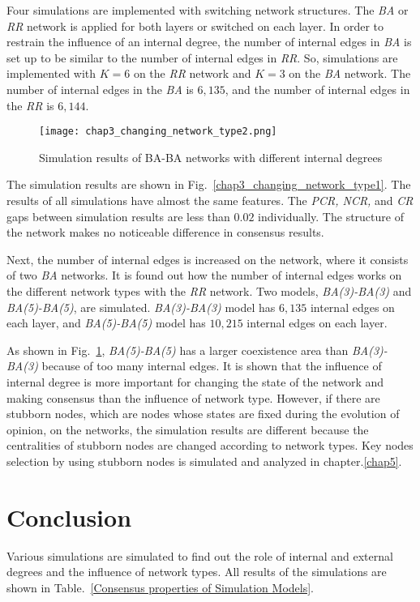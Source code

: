 Four simulations are implemented with switching network structures. The \textit{BA} or \textit{RR} network is applied for both layers or switched on each layer. In order to restrain the influence of an internal degree, the number of internal edges in \textit{BA} is set up to be similar to the number of internal edges in \textit{RR}. So, simulations are implemented with $K=6$ on the \textit{RR} network and $K=3$ on the \textit{BA} network. The number of internal edges in the \textit{BA} is $6,135$, and the number of internal edges in the \textit{RR} is $6,144$.

\begin{figure}[!htb]
	\centering
	\texttt{[image: chap3\_changing\_network\_type2.png]}
	\caption{Simulation results of BA-BA networks with different internal degrees}
	\label{chap3_changing_network_type2}
\end{figure}

The simulation results are shown in Fig.~\ref{chap3_changing_network_type1}. The results of all simulations have almost the same features. The \textit{PCR, NCR,} and \textit{CR} gaps between simulation results are less than $0.02$ individually. The structure of the network makes no noticeable difference in consensus results. 

Next, the number of internal edges is increased on the network, where it consists of two \textit{BA} networks. It is found out how the number of internal edges works on the different network types with the \textit{RR} network. Two models, \textit{BA(3)-BA(3)} and \textit{BA(5)-BA(5)}, are simulated. \textit{BA(3)-BA(3)} model has $6,135$ internal edges on each layer, and \textit{BA(5)-BA(5)} model has $10,215$ internal edges on each layer.

As shown in Fig.~\ref{chap3_changing_network_type2}, \textit{BA(5)-BA(5)} has a larger coexistence area than \textit{BA(3)-BA(3)} because of too many internal edges. It is shown that the influence of internal degree is more important for changing the state of the network and making consensus than the influence of network type. However, if there are stubborn nodes, which are nodes whose states are fixed during the evolution of opinion, on the networks, the simulation results are different because the centralities of stubborn nodes are changed according to network types. Key nodes selection by using stubborn nodes is simulated and analyzed in chapter.\ref{chap5}.\\

\section{Conclusion}
Various simulations are simulated to find out the role of internal and external degrees and the influence of network types. All results of the simulations are shown in Table.~\ref{Consensus properties of Simulation Models}.
 
